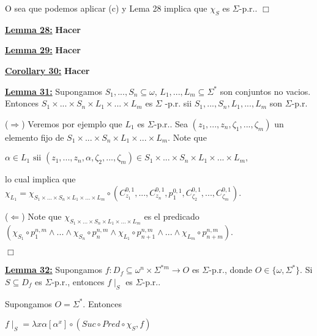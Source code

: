   O sea que podemos aplicar (c) y Lema 28 implica que \(\chi _{S}\) es \( \Sigma \)-p.r.. \(\Box\)


  \textbf{\underline{Lemma 28:}}
    \textbf{Hacer}
  \PROOF

  \textbf{\underline{Lemma 29:}}
    \textbf{Hacer}

  \PROOF

  \textbf{\underline{Corollary 30:}}
    \textbf{Hacer}

  \PROOF


  \textbf{\underline{Lemma 31:}} Supongamos \(S_{1},...,S_{n}\subseteq \omega \), \( L_{1},...,L_{m}\subseteq \Sigma ^{\ast }\) son conjuntos no vacios. Entonces \( S_{1}\times ...\times S_{n}\times L_{1}\times ...\times L_{m}\) es \(\Sigma \) -p.r. sii \(S_{1},...,S_{n},L_{1},...,L_{m}\) son \(\Sigma \)-p.r.

  \PROOF (\(\Rightarrow \)) Veremos por ejemplo que \(L_{1}\) es \(\Sigma \)-p.r.. Sea \( (z_{1},...,z_{n},\zeta _{1},...,\zeta _{m})\) un elemento fijo de \( S_{1}\times ...\times S_{n}\times L_{1}\times ...\times L_{m}.\) Note que

  \(\displaystyle \alpha \in L_{1}\text{ sii }(z_{1},...,z_{n},\alpha ,\zeta _{2},...,\zeta _{m})\in S_{1}\times ...\times S_{n}\times L_{1}\times ...\times L_{m}, \)

  lo cual implica que
  \(\displaystyle \chi _{L_{1}}=\chi _{S_{1}\times ...\times S_{n}\times L_{1}\times ...\times L_{m}}\circ \left( C_{z_{1}}^{0,1},...,C_{z_{n}}^{0,1},p_{1}^{0,1},C_{\zeta _{2}}^{0,1},...,C_{\zeta _{m}}^{0,1}\right) . \)

  (\(\Leftarrow \)) Note que \(\chi _{S_{1}\times ...\times S_{n}\times L_{1}\times ...\times L_{m}}\) es el predicado
  \(\displaystyle \left( \chi _{S_{1}}\circ p_{1}^{n,m}\wedge ...\wedge \chi _{S_{n}}\circ p_{n}^{n,m}\wedge \chi _{L_{1}}\circ p_{n+1}^{n,m}\wedge ...\wedge \chi _{L_{m}}\circ p_{n+m}^{n,m}\right) . \)

  \(\Box\)


  \textbf{\underline{Lemma 32:}} Supongamos \(f:D_{f}\subseteq \omega ^{n}\times \Sigma ^{\ast m}\rightarrow O\) es \(\Sigma \)-p.r., donde \(O\in \{\omega ,\Sigma ^{\ast }\}.\) Si \(S\subseteq D_{f}\) es \(\Sigma \)-p.r., entonces \(f\mid _{S}\) es \(\Sigma \)-p.r..

  \PROOF Supongamos \(O=\Sigma ^{\ast }\). Entonces

  \(\displaystyle f\mid _{S}=\lambda x\alpha \left[ \alpha ^{x}\right] \circ \left( Suc\circ Pred\circ \chi _{S},f\right) \)

